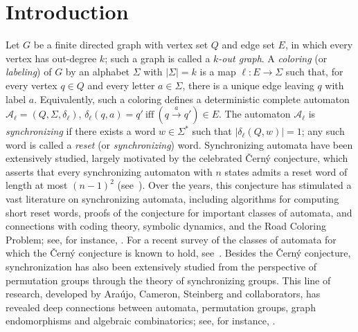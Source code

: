 \documentclass[a4paper,10pt]{amsart}
\theoremstyle{plain}
\theoremstyle{definition}
\begin{document}
\section{Introduction}
Let $G$ be a finite directed graph with vertex set $Q$ and edge set $E$, in which every vertex has out-degree $k$; such a graph is called a \emph{$k$-out graph}. A \emph{coloring} (or \emph{labeling}) of $G$ by an alphabet $\Sigma$ with $|\Sigma|=k$ is a map $\ell:E\to\Sigma$ such that, for every vertex $q\in Q$ and every letter $a\in\Sigma$, there is a unique edge leaving $q$ with label $a$. Equivalently, such a coloring defines a deterministic complete automaton $\mathcal A_\ell=(Q,\Sigma,\delta_\ell)$, $\delta_\ell(q,a)=q'
\ \text{iff}\ (q\xrightarrow{a}q')\in E.$
The automaton $\mathcal A_\ell$ is \emph{synchronizing} if there exists a word
$w\in\Sigma^*$ such that $|\delta_\ell(Q,w)|=1$; any such word is called a
\emph{reset} (or \emph{synchronizing}) word.
Synchronizing automata have been extensively studied, largely motivated by the
celebrated \v{C}ern\'y conjecture, which asserts that every synchronizing
automaton with $n$ states admits a reset word of length at most $(n-1)^2$
(see~\cite{Ce64}).
Over the years, this conjecture has stimulated a vast literature on
synchronizing automata, including algorithms for computing short reset words,
proofs of the conjecture for important classes of automata, and connections
with coding theory, symbolic dynamics, and the Road Coloring Problem; see, for
instance,
\cite{AlRo, BeBePe, Dubuc, Epp, Kari, Ro18Adv, SteinbEJC, Steinb, Trah,
trahtman2009, Vo_CIAA07, Don, BehJoh, Perrin_unamb_coded_shifts}.
For a recent survey of the classes of automata for which the \v{C}ern\'y
conjecture is known to hold, see~\cite{survey_volkov_2025}. Besides the \v{C}ern\'y conjecture, synchronization has also been extensively studied from the perspective of permutation groups through the theory of synchronizing groups. This line of research, developed by Ara\'ujo, Cameron, Steinberg and collaborators, has revealed deep connections between automata, permutation groups, graph endomorphisms and algebraic combinatorics; see, for instance,
\cite{AraujoCameronJCTB2014,AraujoEtAlPLMS2016,AraujoCameronSteinberg2017}.
\end{document}
